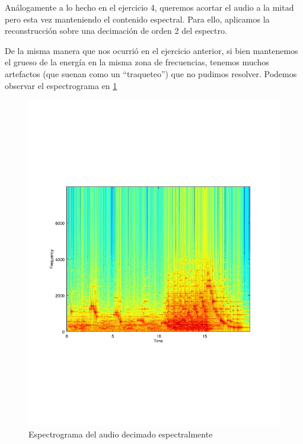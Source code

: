 \documentclass[paper=a4, fontsize=11pt]{scrartcl} %
\numberwithin{equation}{section} %
\numberwithin{figure}{section} %
\numberwithin{table}{section} %
\begin{document}
Análogamente a lo hecho en el ejercicio 4, queremos acortar el audio a la mitad pero esta vez manteniendo el contenido espectral. Para ello, aplicamos la reconstrucción sobre una decimación de orden 2 del espectro.

De la misma manera que nos ocurrió en el ejercicio anterior, si bien mantenemos el grueso de la energía en la misma zona de frecuencias, tenemos muchos artefactos (que suenan como un ``traqueteo'') que no pudimos resolver. Podemos observar el espectrograma en \ref{audio_decimado_espectralmente}

\begin{figure}[b!]
\includegraphics[width=\textwidth]{../images/specgram_7_decimated.pdf}
\caption{Espectrograma del audio decimado espectralmente}
\label{audio_decimado_espectralmente}
\end{figure}
\end{document}
